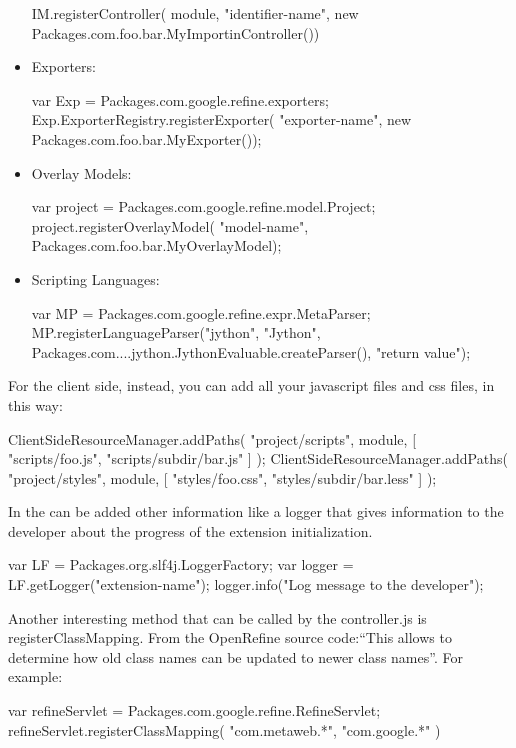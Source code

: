 \begin{itemize}
\begin{code}
IM.registerController(
module, "identifier-name", 
new Packages.com.foo.bar.MyImportinController())
    \end{code}
    \item Exporters:
    \begin{code}
var Exp = Packages.com.google.refine.exporters;
Exp.ExporterRegistry.registerExporter(
"exporter-name", new Packages.com.foo.bar.MyExporter());
	\end{code}
	\item Overlay Models:
	\begin{code}
var project = Packages.com.google.refine.model.Project;
project.registerOverlayModel(
"model-name", Packages.com.foo.bar.MyOverlayModel);
	\end{code}
	\item Scripting Languages:
	\begin{code}
var MP = Packages.com.google.refine.expr.MetaParser;
MP.registerLanguageParser("jython", 
"Jython",
Packages.com....jython.JythonEvaluable.createParser(),
"return value");
	\end{code}
\end{itemize}
For the client side, instead, you can add all your javascript files and css files, in this way:
\begin{code}
ClientSideResourceManager.addPaths(
        "project/scripts",
        module,
        [
            "scripts/foo.js",
            "scripts/subdir/bar.js"
        ]
    );
ClientSideResourceManager.addPaths(
"project/styles",
        module,
        [
            "styles/foo.css",
            "styles/subdir/bar.less"
        ]
    );
\end{code}
In the  can be added other information like a logger that gives information to the developer about the progress of the extension initialization.
\begin{code}
var LF = Packages.org.slf4j.LoggerFactory;
var logger = LF.getLogger("extension-name");
logger.info("Log message to the developer");
\end{code}
Another interesting method that can be called by the controller.js is \textsf{registerClassMapping}. From the OpenRefine source code:``This allows to determine how old class names can be updated to newer class names''. For example:
\begin{code}
var refineServlet = Packages.com.google.refine.RefineServlet;
refineServlet.registerClassMapping(
"com.metaweb.*", "com.google.*"
)
\end{code}

